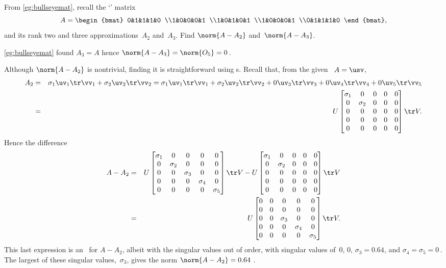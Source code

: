 \begin{example} 
From \cref{eg:bullseyemat}, recall the `' matrix
\begin{equation*}
A=\begin{bmat} 0&1&1&1&0
\\1&0&0&0&1
\\1&0&1&0&1
\\1&0&0&0&1
\\0&1&1&1&0 \end{bmat},
\end{equation*}
and its rank two and three approximations~\(A_2\) and~\(A_3\).
Find \(\norm{A-A_2}\) and~\(\norm{A-A_3}\).
\begin{solution} 
\cref{eg:bullseyemat} found \(A_3=A\) hence \(\norm{A-A_3}=\norm{O_5}=0\)\,.

Although \(\norm{A-A_2}\) is nontrivial, finding it is straightforward using \svd{}s.
Recall that, from the given \svd\ \(A=\usv\),
\begin{eqnarray*}
A_2&=&\sigma_1\uv_1\tr\vv_1+\sigma_2\uv_2\tr\vv_2
=\sigma_1\uv_1\tr\vv_1+\sigma_2\uv_2\tr\vv_2+0\uv_3\tr\vv_3+0\uv_4\tr\vv_4+0\uv_5\tr\vv_5
\\&=&U\begin{bmatrix} \sigma_1&0&0&0&0
\\0&\sigma_2&0&0&0
\\0&0&0&0&0
\\0&0&0&0&0
\\0&0&0&0&0 \end{bmatrix}\tr V.
\end{eqnarray*}
Hence the difference
\begin{eqnarray*}
A-A_2&=&U\begin{bmatrix} \sigma_1&0&0&0&0
\\0&\sigma_2&0&0&0
\\0&0&\sigma_3&0&0
\\0&0&0&\sigma_4&0
\\0&0&0&0&\sigma_5 \end{bmatrix}\tr V
-U\begin{bmatrix} \sigma_1&0&0&0&0
\\0&\sigma_2&0&0&0
\\0&0&0&0&0
\\0&0&0&0&0
\\0&0&0&0&0 \end{bmatrix}\tr V
\\&=&U\begin{bmatrix} 0&0&0&0&0
\\0&0&0&0&0
\\0&0&\sigma_3&0&0
\\0&0&0&\sigma_4&0
\\0&0&0&0&\sigma_5 \end{bmatrix}\tr V.
\end{eqnarray*}
This last expression is an \svd\ for \(A-A_2\), albeit with the singular values out of order, with singular values of~\(0\), \(0\), \(\sigma_3=0.64\), and \(\sigma_4=\sigma_5=0\)\,.
The largest of these singular values,~\(\sigma_3\), gives the norm \(\norm{A-A_2}=0.64\) \twodp.


\end{solution}
\end{example}
